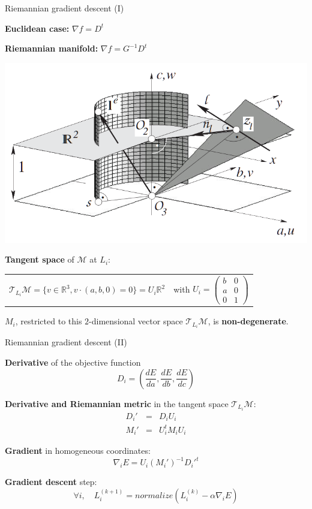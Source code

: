 \begin{frame}[c]{Riemannian gradient descent (I)}
	\scriptsize
	
	\begin{minipage}[t]{0.5\linewidth}
		\textbf{Euclidean case:} $\nabla f = D^{t}$
	\end{minipage}%
	\pause%
	\begin{minipage}[t]{0.5\linewidth}
		\centering
 		\textbf{Riemannian manifold:} $\nabla f = G^{-1} D^t$
	\end{minipage}%
	
	\begin{center}
	\includegraphics[width=0.5\linewidth]{euclidean_normalization_line}
	\end{center}

	\textbf{Tangent space} of $\mathcal{M}$ at $L_i$:
	\begin{tabular}{cc}
		$ \mathcal{T}_{L_i} \mathcal{M} = \{ v \in \mathbb{R}^3, v \cdot (a,b, 0) = 0 \} = U_i \mathbb{R}^2 $
		& with $U_i = \begin{pmatrix} b & 0 \\ a & 0 \\ 0 & 1 \end{pmatrix}$
	\end{tabular}

	$M_i$, restricted to this $2$-dimensional vector space $\mathcal{T}_{L_i} \mathcal{M}$, is \textbf{non-degenerate}.
\end{frame}

\begin{frame}[c]{Riemannian gradient descent (II)}
	\scriptsize

	\textbf{Derivative} of the objective function
	\[ D_i = \left( \frac{dE }{da},  \frac{dE }{db}, \frac{dE }{dc} \right) \]	
	
	\textbf{Derivative and Riemannian metric} in the tangent space $\mathcal{T}_{L_i} \mathcal{M}$:
	\begin{eqnarray*}
		D_i' &=& D_i U_i \\
		M_i' &=& U_i^t  M_i U_i
	\end{eqnarray*}
	
	\textbf{Gradient} in homogeneous coordinates:
	\[
	\nabla_i E = U_i (M_i')^{-1} {D_i'}^t
	\]
	
	\textbf{Gradient descent} step:
	\[
	\forall i,  \quad L_i^{(k+1)} = normalize\left(  L_i^{(k)} - \alpha \nabla_i E   \right) 
	\]
\end{frame}

